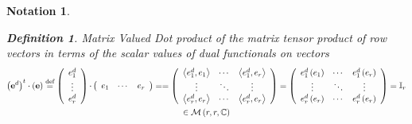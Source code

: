 \documentclass[aps,preprint]{revtex4}%
\newtheorem{definition}[theorem]{Definition}
\newtheorem{notation}[theorem]{Notation}
\begin{document}
\begin{notation}
\begin{enumerate}
\begin{definition}
\emph{Matrix Valued Dot} product of the \emph{matrix tensor product} of row
vectors in terms of the scalar values of dual functionals on vectors
\begin{gather}
\left(  \mathbf{e}^{d}\right)  ^{t}\cdot\left(  \mathbf{e}\right)
\overset{\text{def}}{=}\left(
\begin{array}
[c]{c}%
e_{1}^{d}\\
\vdots\\
e_{r}^{d}%
\end{array}
\right)  \mathbf{\cdot}\left(
\begin{array}
[c]{ccc}%
e_{1} & \cdots & e_{r}%
\end{array}
\right)  ==\left(
\begin{array}
[c]{ccc}%
\left\langle e_{1}^{d},e_{1}\right\rangle  & \cdots & \left\langle e_{1}%
^{d},e_{r}\right\rangle \\
\vdots & \ddots & \vdots\\
\left\langle e_{r}^{d},e_{r}\right\rangle  & \cdots & \left\langle e_{r}%
^{d},e_{r}\right\rangle
\end{array}
\right)  =\left(
\begin{array}
[c]{ccc}%
e_{1}^{d}\left(  e_{1}\right)  & \cdots & e_{1}^{d}\left(  e_{r}\right) \\
\vdots & \ddots & \vdots\\
e_{r}^{d}\left(  e_{r}\right)  & \cdots & e_{r}^{d}\left(  e_{r}\right)
\end{array}
\right)  =\mathbb{I}_{r}\\
\in\mathcal{M}\left(  r,r,\mathbb{C}\right)
\end{gather}

\end{definition}


\end{enumerate}
\end{notation}
\end{document}

